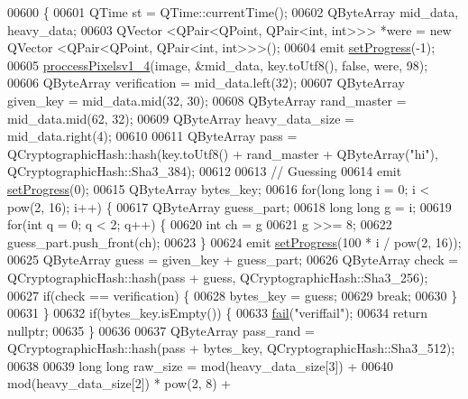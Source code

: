 \begin{DoxyCode}
00600 \{
00601     QTime st = QTime::currentTime();
00602     QByteArray mid\_data, heavy\_data;
00603     QVector <QPair<QPoint, QPair<int, int>>> *were = \textcolor{keyword}{new} QVector <QPair<QPoint, QPair<int, int>>>();
00604     emit \hyperlink{class_model_p_c_afdcd80f0ed5062e145a71f09b0897547}{setProgress}(-1);
00605     \hyperlink{class_model_p_c_a5cdb4d1d61ff62ee9d45b496a7dbf1fb}{proccessPixelsv1\_4}(image, &mid\_data, key.toUtf8(), \textcolor{keyword}{false}, were, 98);
00606     QByteArray verification = mid\_data.left(32);
00607     QByteArray given\_key = mid\_data.mid(32, 30);
00608     QByteArray rand\_master = mid\_data.mid(62, 32);
00609     QByteArray heavy\_data\_size = mid\_data.right(4);
00610 
00611     QByteArray pass = QCryptographicHash::hash(key.toUtf8() + rand\_master + QByteArray(\textcolor{stringliteral}{"hi"}), 
      QCryptographicHash::Sha3\_384);
00612 
00613     \textcolor{comment}{// Guessing}
00614     emit \hyperlink{class_model_p_c_afdcd80f0ed5062e145a71f09b0897547}{setProgress}(0);
00615     QByteArray bytes\_key;
00616     \textcolor{keywordflow}{for}(\textcolor{keywordtype}{long} \textcolor{keywordtype}{long} i = 0; i < pow(2, 16); i++) \{
00617         QByteArray guess\_part;
00618         \textcolor{keywordtype}{long} \textcolor{keywordtype}{long} g = i;
00619         \textcolor{keywordflow}{for}(\textcolor{keywordtype}{int} q = 0; q < 2; q++) \{
00620                 \textcolor{keywordtype}{int} ch = g %
00621                 g >>= 8;
00622                 guess\_part.push\_front(ch);
00623             \}
00624         emit \hyperlink{class_model_p_c_afdcd80f0ed5062e145a71f09b0897547}{setProgress}(100 * i / pow(2, 16));
00625         QByteArray guess = given\_key + guess\_part;
00626         QByteArray check = QCryptographicHash::hash(pass + guess, QCryptographicHash::Sha3\_256);
00627         \textcolor{keywordflow}{if}(check == verification) \{
00628             bytes\_key = guess;
00629             \textcolor{keywordflow}{break};
00630         \}
00631     \}
00632     \textcolor{keywordflow}{if}(bytes\_key.isEmpty()) \{
00633         \hyperlink{class_model_p_c_a47464b59b7e37fcee25e55475708aabd}{fail}(\textcolor{stringliteral}{"veriffail"});
00634         \textcolor{keywordflow}{return} \textcolor{keyword}{nullptr};
00635     \}
00636 
00637     QByteArray pass\_rand = QCryptographicHash::hash(pass + bytes\_key, QCryptographicHash::Sha3\_512);
00638 
00639     \textcolor{keywordtype}{long} \textcolor{keywordtype}{long} raw\_size = mod(heavy\_data\_size[3]) +
00640             mod(heavy\_data\_size[2]) * pow(2, 8) +

\end{DoxyCode}
